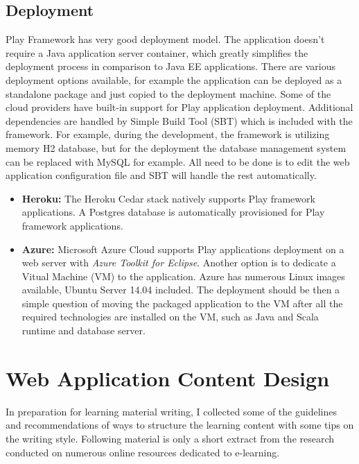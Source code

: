\documentclass[12pt,twoside,a4paper]{report}
\begin{document}
\subsection{Deployment}\label{3.3.3}
Play Framework has very good deployment model. The application doesn't require a Java application server container, which greatly simplifies the deployment process in comparison to Java EE applications. There are various deployment options available, for example the application can be deployed as a standalone package and just copied to the deployment machine. Some of the cloud providers have built-in support for Play application deployment. Additional dependencies are handled by Simple Build Tool (SBT)\cite{29} which is included with the framework. For example,	 during the development, the framework is utilizing memory H2 database, but for the deployment the database management system can be replaced with MySQL for example. All need to be done is to edit the web application configuration file and SBT will handle the rest automatically.
\begin{itemize}\itemsep1pt \parskip0pt 
\item \textbf{Heroku:} The Heroku Cedar stack natively supports Play framework applications. A Postgres database is automatically provisioned for Play framework applications.\cite{26}
\item \textbf{Azure:} Microsoft Azure Cloud supports Play applications deployment on a web server with \emph{Azure Toolkit for Eclipse}. Another option is to dedicate a Vitual Machine (VM) to the application. Azure has numerous Linux images available, Ubuntu Server 14.04 included. The deployment should be then a simple question of moving the packaged application to the VM after all the required technologies are installed on the VM, such as Java and Scala runtime and database server.\cite{27}
\end{itemize}
\section{Web Application Content Design}\label{3.4}
In preparation for learning material writing, I collected some of the guidelines and recommendations of ways to structure the learning content with some tips on the writing style. Following material is only a short extract from the research conducted on numerous online resources dedicated to e-learning.
\end{document}
